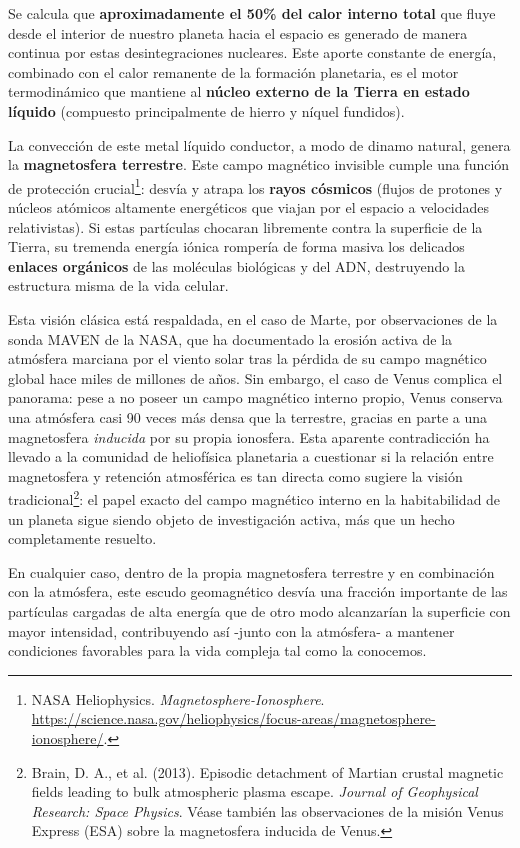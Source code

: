 \documentclass[11pt,a4paper]{book}
\begin{document}
Se calcula que \textbf{aproximadamente el 50\% del calor interno total} que fluye desde el interior de nuestro planeta hacia el espacio es generado de manera continua por estas desintegraciones nucleares. Este aporte constante de energía, combinado con el calor remanente de la formación planetaria, es el motor termodinámico que mantiene al \textbf{núcleo externo de la Tierra en estado líquido} (compuesto principalmente de hierro y níquel fundidos). 

La convección de este metal líquido conductor, a modo de dinamo natural, genera la \textbf{magnetosfera terrestre}. Este campo magnético invisible cumple una función de protección crucial\footnote{NASA Heliophysics. \emph{Magnetosphere-Ionosphere}. \url{https://science.nasa.gov/heliophysics/focus-areas/magnetosphere-ionosphere/}.}: desvía y atrapa los \textbf{rayos cósmicos} (flujos de protones y núcleos atómicos altamente energéticos que viajan por el espacio a velocidades relativistas). Si estas partículas chocaran libremente contra la superficie de la Tierra, su tremenda energía iónica rompería de forma masiva los delicados \textbf{enlaces orgánicos} de las moléculas biológicas y del ADN, destruyendo la estructura misma de la vida celular. 

Esta visión clásica está respaldada, en el caso de Marte, por observaciones de la sonda MAVEN
de la NASA, que ha documentado la erosión activa de la atmósfera marciana por el viento solar
tras la pérdida de su campo magnético global hace miles de millones de años. Sin embargo, el
caso de Venus complica el panorama: pese a no poseer un campo magnético interno propio, Venus
conserva una atmósfera casi 90 veces más densa que la terrestre, gracias en parte a una
magnetosfera \emph{inducida} por su propia ionosfera. Esta aparente contradicción ha llevado a
la comunidad de heliofísica planetaria a cuestionar si la relación entre magnetosfera y
retención atmosférica es tan directa como sugiere la visión tradicional\footnote{Brain, D. A., et al. (2013). Episodic detachment of Martian crustal magnetic fields leading to bulk atmospheric plasma escape. \emph{Journal of Geophysical Research: Space Physics}. Véase también las observaciones de la misión Venus Express (ESA) sobre la magnetosfera inducida de Venus.}: el papel exacto del campo magnético interno en la habitabilidad de un planeta sigue siendo objeto
de investigación activa, más que un hecho completamente resuelto.

En cualquier caso, dentro de la propia magnetosfera terrestre y en combinación con la atmósfera,
este escudo geomagnético desvía una fracción importante de las partículas cargadas de alta
energía que de otro modo alcanzarían la superficie con mayor intensidad, contribuyendo así
-junto con la atmósfera- a mantener condiciones favorables para la vida compleja tal como la
conocemos.
\end{document}
